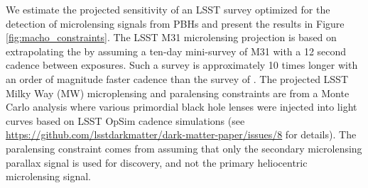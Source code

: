 
We estimate the projected sensitivity of an LSST survey optimized for the detection of microlensing signals from PBHs and present the results in Figure \ref{fig:macho_constraints}.
The LSST M31 microlensing projection is based on extrapolating the \citet{1701.02151} by assuming a ten-day mini-survey of M31 with a 12 second cadence between exposures.
Such a survey is approximately 10 times longer with an order of magnitude faster cadence than the survey of \citet{1701.02151}.
The projected LSST Milky Way (MW) microplensing and paralensing constraints are from a Monte Carlo analysis where various primordial black hole lenses were injected into light curves based on LSST OpSim cadence simulations (see \url{https://github.com/lsstdarkmatter/dark-matter-paper/issues/8} for details).
The paralensing constraint comes from assuming that only the secondary microlensing parallax signal is used for discovery, and not the primary heliocentric microlensing signal.

\begin{comment}
        The microlensing and paralensing signals for a $23^\mathrm{rd}$ magnitude sourcestar in the bulge being lensed by a $50\,\mathrm{M}_\odot$ black hole. 
        For events with an Einstein crossing time much less than a year (i.e., approximately solar mass and below), the microlensing magnification will appear symmetric in time (orange curve).
        For microlensing events lasting on the order of a year or more (i.e., approximately solar mass and above), the lensing geometry changes as Earth orbits the Sun, leading to a parallax effect.
        This paralensing signal has a period of a year, with the phase determined by the coordinates of the source star, making it robust to other astrophysical systematics.
        It is also possible to detect binary dark matter, and extend the mass range to planet mass compact dark matter, via the source passing through one of the gravitational lensing caustic curves formed by the binary lens.
        The green curve on top of the heliocentric orange curve is representative of a typical planetary microlensing event caused by a caustic crossing.
        While LSST can measure these events if lucky, we will rely on LSST to detect the heliocentric microlensing event and trigger targeted follow-up higher cadence observations to measure the planetary microlensing event.
        The black data points are representative of extending the LSST wide-fast-deep cadence into the Galactic plane. \WAD{Need to update this figure with the LSST WFD cadence.}
        \emph{[Right]}
        A cartoon diagram of paralensing. 
        For microlensing events lasting on the order of a year or more the lensing geometry changes as Earth orbits the Sun, leading to a parallax effect.
        \Contributors{Will D., PALS Collaboration}
\end{comment}



